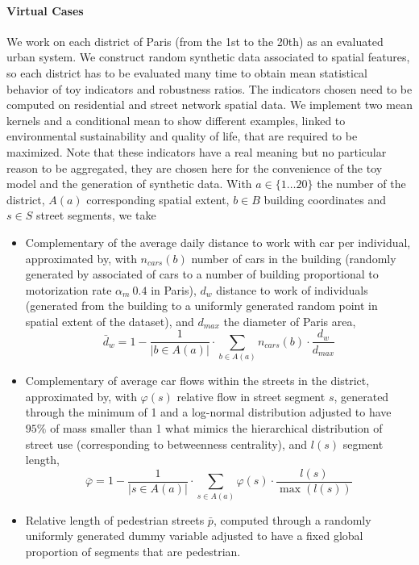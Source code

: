 \documentclass[runningheads,a4paper]{llncs2e/llncs}
\begin{document}



\paragraph{Virtual Cases}

We work on each district of Paris (from the 1st to the 20th) as an evaluated urban system. We construct random synthetic data associated to spatial features, so each district has to be evaluated many time to obtain mean statistical behavior of toy indicators and robustness ratios. The indicators chosen need to be computed on residential and street network spatial data. We implement two mean kernels and a conditional mean to show different examples, linked to environmental sustainability and quality of life, that are required to be maximized. Note that these indicators have a real meaning but no particular reason to be aggregated, they are chosen here for the convenience of the toy model and the generation of synthetic data. With $a\in \{1\ldots 20\}$ the number of the district, $A(a)$ corresponding spatial extent, $b\in B$ building coordinates and $s\in S$ street segments, we take
\begin{itemize}
\item Complementary of the average daily distance to work with car per individual, approximated by, with $n_{cars}(b)$ number of cars in the building (randomly generated by associated of cars to a number of building proportional to motorization rate $\alpha_m ~ 0.4$ in Paris), $d_w$ distance to work of individuals (generated from the building to a uniformly generated random point in spatial extent of the dataset), and $d_{max}$ the diameter of Paris area,
\[
\bar{d}_w = 1 - \frac{1}{|b\in A(a)|} \cdot \sum_{b\in A(a)}{n_{cars}(b)\cdot \frac{d_w}{d_{max}}}
\]

\item Complementary of average car flows within the streets in the district, approximated by, with $\varphi(s)$ relative flow in street segment $s$, generated through the minimum of 1 and a log-normal distribution adjusted to have $95\%$ of mass smaller than 1 what mimics the hierarchical distribution of street use (corresponding to betweenness centrality), and $l(s)$ segment length,
\[
\bar{\varphi} = 1 - \frac{1}{|s\in A(a)|} \cdot \sum_{s \in A(a)}{\varphi(s)\cdot \frac{l(s)}{\max{(l(s))}}}
\]

\item Relative length of pedestrian streets $\bar{p}$, computed through a randomly uniformly generated dummy variable adjusted to have a fixed global proportion of segments that are pedestrian.
\end{itemize}
\end{document}
